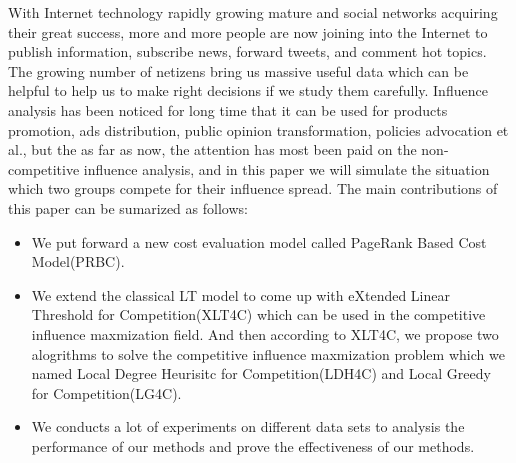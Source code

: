 \begin{eabstract} 
With Internet technology rapidly growing mature and social networks acquiring their great success, more and more people are now joining into the Internet to publish information, subscribe news, forward  tweets, and comment hot topics. The growing number of netizens bring us massive useful data which can be helpful to help us to make right decisions if we study them carefully. Influence analysis has been noticed for long time that it can be used for products promotion, ads distribution, public opinion transformation, policies advocation et al., but the as far as now, the attention has most been paid on the non-competitive influence analysis, and in this paper we will simulate the situation which two groups compete for their influence spread. The main contributions of this paper can be sumarized as follows:
\begin{itemize}
\item We put forward a new cost evaluation model called PageRank Based Cost Model(PRBC).
\item We extend the classical LT model to come up with eXtended Linear Threshold for Competition(XLT4C) which can be used in the competitive influence maxmization field. And then according to XLT4C, we propose two alogrithms to solve the competitive influence maxmization problem which we named Local Degree Heurisitc for Competition(LDH4C) and Local Greedy for Competition(LG4C).
\item We conducts a lot of experiments on different data sets to analysis the performance of our methods and prove the effectiveness of our methods. 
\end{itemize} 
\end{eabstract}

